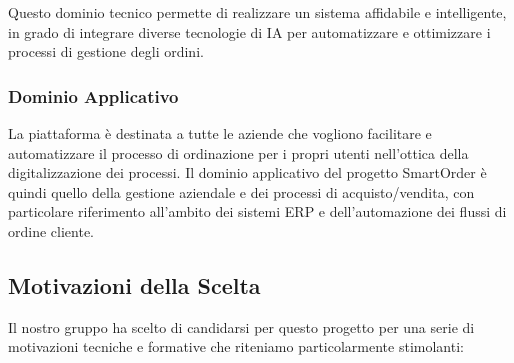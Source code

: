 \documentclass[a4paper,12pt]{article}
\begin{document}
Questo dominio tecnico permette di realizzare un sistema affidabile e intelligente, in grado di integrare diverse tecnologie di IA per automatizzare e ottimizzare i processi di gestione degli ordini.

\subsubsection{Dominio Applicativo}
La piattaforma è destinata a tutte le aziende che vogliono facilitare e automatizzare il processo di ordinazione per i propri utenti nell’ottica della digitalizzazione dei processi. Il dominio applicativo del progetto SmartOrder è quindi quello della gestione aziendale e dei processi di acquisto/vendita, con particolare riferimento all’ambito dei sistemi ERP e dell’automazione dei flussi di ordine cliente.

\subsection{Motivazioni della Scelta}
Il nostro gruppo ha scelto di candidarsi per questo progetto per una serie di motivazioni tecniche e formative che riteniamo particolarmente stimolanti:
\end{document}
